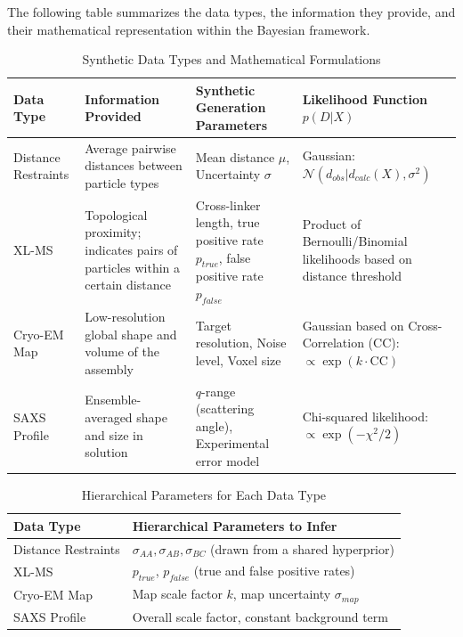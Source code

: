 \documentclass{article}
\begin{document}
The following table summarizes the data types, the information they provide, and their mathematical representation within the Bayesian framework.

\begin{table}[h]
\centering
\small
\begin{tabular}{|p{2.5cm}|p{4cm}|p{4cm}|p{4cm}|}
\hline
\textbf{Data Type} & \textbf{Information Provided} & \textbf{Synthetic Generation Parameters} & \textbf{Likelihood Function $p(D|X)$} \\
\hline
Distance Restraints & Average pairwise distances between particle types & Mean distance $\mu$, Uncertainty $\sigma$ & Gaussian: $\mathcal{N}(d_{obs} | d_{calc}(X), \sigma^2)$ \\
\hline
XL-MS & Topological proximity; indicates pairs of particles within a certain distance & Cross-linker length, true positive rate $p_{true}$, false positive rate $p_{false}$ & Product of Bernoulli/Binomial likelihoods based on distance threshold \\
\hline
Cryo-EM Map & Low-resolution global shape and volume of the assembly & Target resolution, Noise level, Voxel size & Gaussian based on Cross-Correlation (CC): $\propto \exp(k \cdot \text{CC})$ \\
\hline
SAXS Profile & Ensemble-averaged shape and size in solution & $q$-range (scattering angle), Experimental error model & Chi-squared likelihood: $\propto \exp(-\chi^2/2)$ \\
\hline
\end{tabular}
\caption{Synthetic Data Types and Mathematical Formulations}
\label{tab:compendium-part1}
\end{table}

\begin{table}[h]
\centering
\small
\begin{tabular}{|p{3cm}|p{10cm}|}
\hline
\textbf{Data Type} & \textbf{Hierarchical Parameters to Infer} \\
\hline
Distance Restraints & $\sigma_{AA}, \sigma_{AB}, \sigma_{BC}$ (drawn from a shared hyperprior) \\
\hline
XL-MS & $p_{true}$, $p_{false}$ (true and false positive rates) \\
\hline
Cryo-EM Map & Map scale factor $k$, map uncertainty $\sigma_{map}$ \\
\hline
SAXS Profile & Overall scale factor, constant background term \\
\hline
\end{tabular}
\caption{Hierarchical Parameters for Each Data Type}
\label{tab:compendium-part2}
\end{table}
\end{document}
